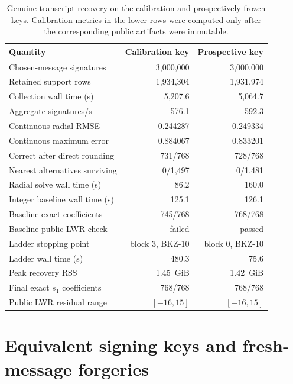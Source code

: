 \documentclass[11pt,a4paper]{article}
\newcommand{\RealRows}{1{,}934{,}304}
\newcommand{\RealCollectionSeconds}{5{,}207.6}
\newcommand{\RealCollectionRate}{576.1}
\newcommand{\RealRadialRMSE}{0.244287}
\newcommand{\RealRadialMaxError}{0.884067}
\newcommand{\RealRoundedExact}{731}
\newcommand{\RealRadialSeconds}{86.2}
\newcommand{\RealIntegerSeconds}{125.1}
\newcommand{\RealLatticeSeconds}{480.3}
\newcommand{\RealPeakRSS}{1.45~GiB}
\newcommand{\RealLWRRange}{\ensuremath{[-16,15]}}
\newcommand{\RealRecoveredExact}{768}
\newcommand{\ProspectiveRows}{1{,}931{,}974}
\newcommand{\ProspectiveCollectionSeconds}{5{,}064.7}
\newcommand{\ProspectiveCollectionRate}{592.3}
\newcommand{\ProspectiveRadialRMSE}{0.249334}
\newcommand{\ProspectiveRadialMaxError}{0.833201}
\newcommand{\ProspectiveRoundedExact}{728}
\newcommand{\ProspectiveRadialSeconds}{160.0}
\newcommand{\ProspectiveIntegerSeconds}{126.1}
\newcommand{\ProspectiveLatticeSeconds}{75.6}
\newcommand{\ProspectivePeakRSS}{1.42~GiB}
\begin{document}
\begin{table}[ht]
\centering
\small
\caption{Genuine-transcript recovery on the calibration and prospectively
frozen keys.  Calibration metrics in the lower rows were computed only after
the corresponding public artifacts were immutable.}
\begin{tabular}{@{}lrr@{}}
\toprule
Quantity & Calibration key & Prospective key\\
\midrule
Chosen-message signatures & 3,000,000 & 3,000,000\\
Retained support rows & \RealRows & \ProspectiveRows\\
Collection wall time (s) & \RealCollectionSeconds & \ProspectiveCollectionSeconds\\
Aggregate signatures/s & \RealCollectionRate & \ProspectiveCollectionRate\\
Continuous radial RMSE & \RealRadialRMSE & \ProspectiveRadialRMSE\\
Continuous maximum error & \RealRadialMaxError & \ProspectiveRadialMaxError\\
Correct after direct rounding & \RealRoundedExact/768 & \ProspectiveRoundedExact/768\\
Nearest alternatives surviving & 0/1,497 & 0/1,481\\
Radial solve wall time (s) & \RealRadialSeconds & \ProspectiveRadialSeconds\\
Integer baseline wall time (s) & \RealIntegerSeconds & \ProspectiveIntegerSeconds\\
Baseline exact coefficients & 745/768 & 768/768\\
Baseline public LWR check & failed & passed\\
Ladder stopping point & block 3, BKZ-10 & block 0, BKZ-10\\
Ladder wall time (s) & \RealLatticeSeconds & \ProspectiveLatticeSeconds\\
Peak recovery RSS & \RealPeakRSS & \ProspectivePeakRSS\\
Final exact $s_1$ coefficients & \RealRecoveredExact/768 & 768/768\\
Public LWR residual range & \RealLWRRange & $[-16,15]$\\
\bottomrule
\end{tabular}
\label{tab:final}
\end{table}
\FloatBarrier

\section{Equivalent signing keys and fresh-message forgeries}
\label{sec:forgery}
\end{document}
